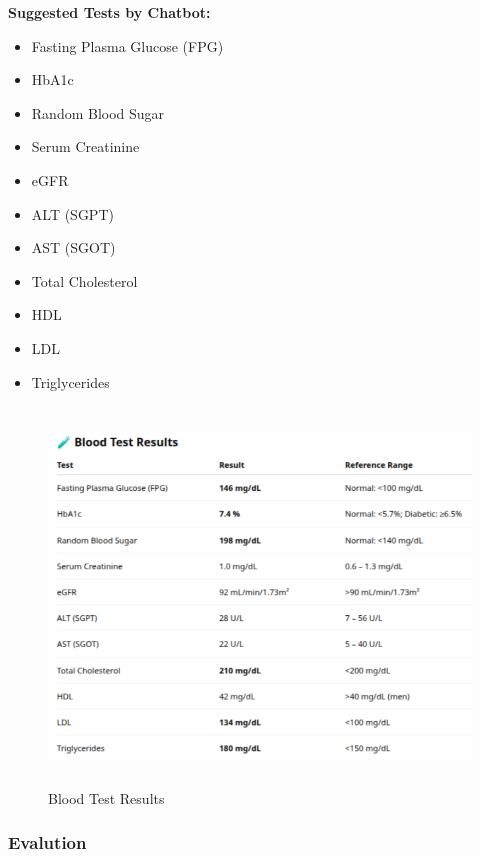 \documentclass[12pt,a4paper]{report}
\begin{document}
 
\textbf{Suggested Tests by Chatbot:}

\begin{itemize}
    \item Fasting Plasma Glucose (FPG)
    \item HbA1c
    \item Random Blood Sugar
    \item Serum Creatinine
    \item eGFR
    \item ALT (SGPT)
    \item AST (SGOT)
    \item Total Cholesterol
    \item HDL
    \item LDL
    \item Triglycerides
\end{itemize}

\begin{figure}[H]
    \centering
    \includegraphics[width=14cm, height=10cm]{BloodTestResults}
    \caption{Blood Test Results}
    \label{fig:Blood Test Results}
\end{figure}


\subsubsection{Evalution}
\label{Evalution}
\end{document}
